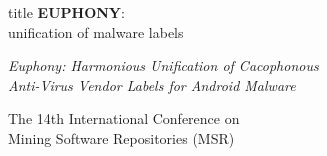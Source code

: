 \begin{frame}
    \vfill
    \centering

    \begin{beamercolorbox}[sep=8pt,center,shadow=true,rounded=true]{title}
        \textbf{EUPHONY}:\\
        unification of malware labels

        \small{}

        \bigskip{}

        \textit{
            Euphony: Harmonious Unification of Cacophonous \\
            Anti-Virus Vendor Labels for Android Malware}

        \medskip{}

        The 14th International Conference on \\
        Mining Software Repositories (MSR)
    \end{beamercolorbox}

    \vfill
\end{frame}

